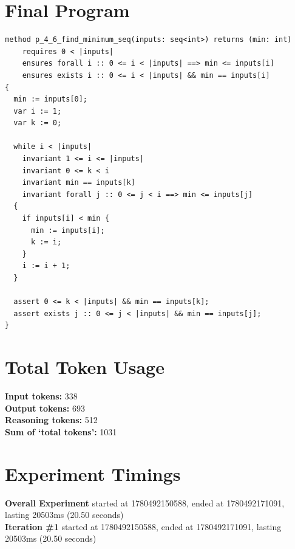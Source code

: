 \documentclass{article}
\begin{document}
\section*{Final Program}
\begin{lstlisting}
method p_4_6_find_minimum_seq(inputs: seq<int>) returns (min: int)
	requires 0 < |inputs|
	ensures forall i :: 0 <= i < |inputs| ==> min <= inputs[i]
	ensures exists i :: 0 <= i < |inputs| && min == inputs[i]
{
  min := inputs[0];
  var i := 1;
  var k := 0;

  while i < |inputs|
    invariant 1 <= i <= |inputs|
    invariant 0 <= k < i
    invariant min == inputs[k]
    invariant forall j :: 0 <= j < i ==> min <= inputs[j]
  {
    if inputs[i] < min {
      min := inputs[i];
      k := i;
    }
    i := i + 1;
  }

  assert 0 <= k < |inputs| && min == inputs[k];
  assert exists j :: 0 <= j < |inputs| && min == inputs[j];
}
\end{lstlisting}
\section*{Total Token Usage}
\textbf{Input tokens: }338
\\\textbf{Output tokens: }693
\\\textbf{Reasoning tokens: }512
\\\textbf{Sum of `total tokens': }1031
\section*{Experiment Timings}
\textbf{Overall Experiment} started at 1780492150588, ended at 1780492171091, lasting 20503ms (20.50 seconds)
\\\textbf{Iteration \#1} started at 1780492150588, ended at 1780492171091, lasting 20503ms (20.50 seconds)
\end{document}

